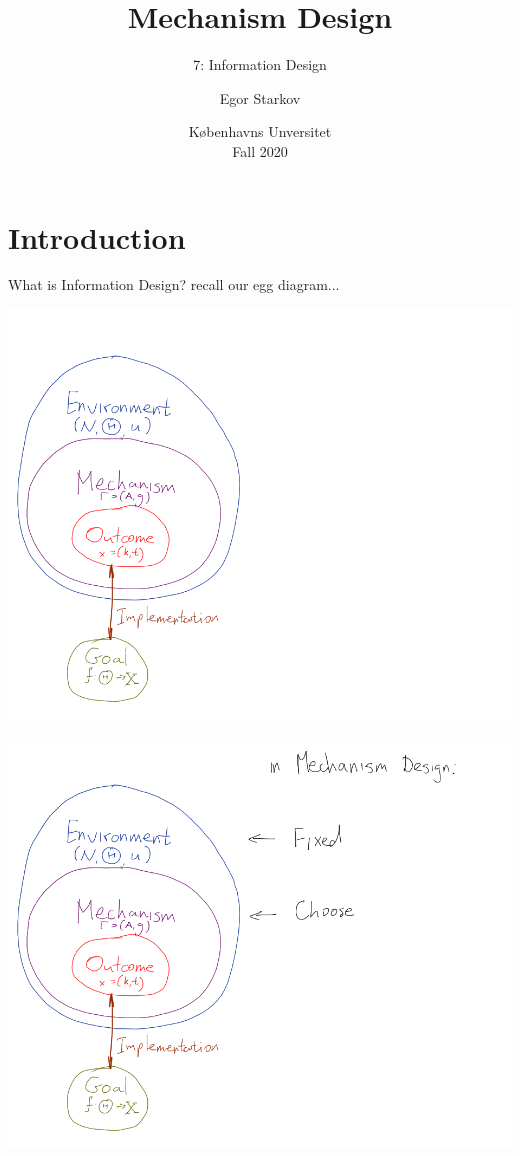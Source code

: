 \documentclass[english,10pt
,aspectratio=169
]{beamer}
\title{Mechanism Design}
\subtitle{7: Information Design}
\author{Egor Starkov}
\date{K{\o}benhavns Unversitet \\
	Fall 2020}
\begin{document}
	\frame[plain]{\titlepage}


\section{Introduction}


\begin{frame}{What is Information Design?}
	recall our egg diagram...
\end{frame}


\begin{frame}
	\centering
	\includegraphics[scale=0.32]{pics/M7/MD_vs_ID_1}
\end{frame}


\begin{frame}
	\centering
	\includegraphics[scale=0.32]{pics/M7/MD_vs_ID_2}
\end{frame}
\end{document}
